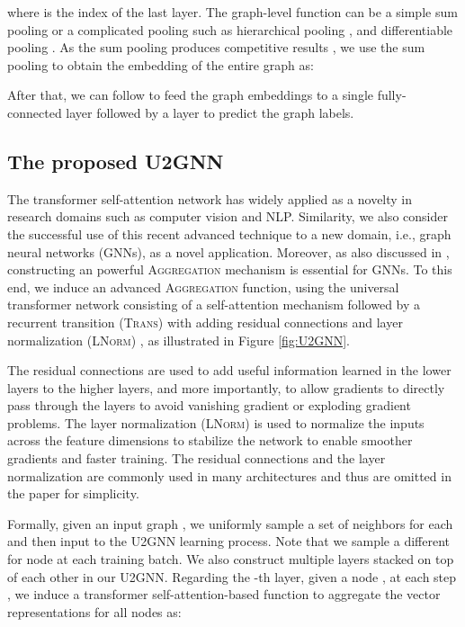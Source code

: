 \documentclass[twoside,leqno,twocolumn]{article}
\newcommand{\citep}{\cite}
\begin{document}
where  is the index of the last layer.
The graph-level  function can be a simple sum pooling \citep{xu2019powerful} or a complicated pooling such as hierarchical pooling \citep{cangea2018towards}, and differentiable pooling \citep{Ying2018diffpool}. 
As the sum pooling produces competitive results \citep{xu2019powerful}, we use the sum pooling to obtain the embedding  of the entire graph  as:


After that, we can follow \citep{xu2019powerful} to feed the graph embeddings  to a single fully-connected layer followed by a  layer to predict the graph labels.



\subsection{The proposed U2GNN} 

The transformer self-attention network \citep{vaswani2017attention,dehghani2018universal} has widely applied as a novelty in research domains such as computer vision and NLP.
Similarity, we also consider the successful use of this recent advanced technique to a new domain, i.e., graph neural networks (GNNs), as a novel application.
Moreover, as also discussed in \citep{xu2019powerful}, constructing an powerful \textsc{Aggregation} mechanism is essential for GNNs. To this end, we induce an advanced \textsc{Aggregation} function, using the universal transformer network \citep{dehghani2018universal} consisting of a self-attention mechanism \citep{vaswani2017attention} followed by a recurrent transition (\textsc{Trans}) with adding residual connections \citep{he2016deep} and layer normalization (\textsc{LNorm}) \citep{ba2016layer}, as illustrated in Figure \ref{fig:U2GNN}.

The residual connections \citep{he2016deep} are used to add useful information learned in the lower layers to the higher layers, and more importantly, to allow gradients to directly pass through the layers to avoid vanishing gradient or exploding gradient problems.
The layer normalization (\textsc{LNorm}) \citep{ba2016layer} is used to normalize the inputs across the feature dimensions to stabilize the network to enable smoother gradients and faster training. 
The residual connections and the layer normalization are commonly used in many architectures and thus are omitted in the paper for simplicity.


Formally, given an input graph , we uniformly sample a set  of neighbors for each  and then input  to the U2GNN learning process. 
Note that we sample a different  for node  at each training batch.
We also construct multiple layers stacked on top of each other in our U2GNN.
Regarding the -th layer, given a node , at each step , we induce a transformer self-attention-based function to aggregate the vector representations for all nodes  as:
\end{document}
